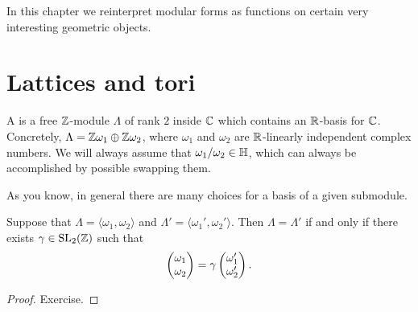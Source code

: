 
In this chapter we reinterpret modular forms as functions on certain very interesting geometric objects.

\section{Lattices and tori}
\begin{definition}
  A  is a free $\mathbb{Z}$-module $\Lambda$ of rank $2$ inside $\mathbb{C}$ which contains an $\mathbb{R}$-basis for $\mathbb{C}$. Concretely, $\Lambda = \mathbb{Z}\omega_1\oplus \mathbb{Z}\omega_2$, where $\omega_1$ and $\omega_2$ are $\mathbb{R}$-linearly independent complex numbers. We will always assume that $\omega_1/\omega_2\in\mathbb{H}$, which can always be accomplished by possible swapping them.
\end{definition}

As you know, in general there are many choices for a basis of a given submodule.
\begin{proposition}
\label{prop:nine}
  Suppose that $\Lambda=\langle \omega_1,\omega_2\rangle$ and $\Lambda'=\langle \omega_1',\omega_2'\rangle$. Then $\Lambda = \Lambda'$ if and only if there exists $\gamma\in\operatorname{SL}_2(\mathbb{Z})$ such that
\[
\left(\begin{matrix}\omega_1\\\omega_2\end{matrix}\right) = \gamma\left(\begin{matrix}\omega'_1\\\omega'_2\end{matrix}\right).
\]
\end{proposition}
\begin{proof}
  Exercise.
\end{proof}

